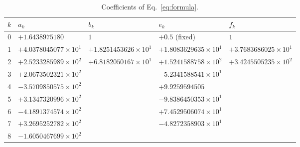 \documentclass[aps,prd,onecolumn,superscriptaddress,nofootinbib,10pt]{revtex4-2}
\begin{document}
\begin{table}[t]
\caption{Coefficients of Eq.~\eqref{eq:formula}.}
\label{tab:coef}
\footnotesize
\begin{ruledtabular}
\begin{tabular}{rllll}
$k$ & $a_k$ & $b_k$ & $e_k$ & $f_k$ \\ \hline
0 & $+1.6438975180$ & $1$ & $+0.5$ (fixed) & $1$ \\
1 & $+4.0378045077\times10^{1}$ & $+1.8251453626\times10^{1}$ & $+1.8083629635\times10^{1}$ & $+3.7683686025\times10^{1}$ \\
2 & $+2.5233285989\times10^{2}$ & $+6.8182050167\times10^{1}$ & $+1.5241588758\times10^{2}$ & $+3.4245505235\times10^{2}$ \\
3 & $+2.0673502321\times10^{2}$ & & $-5.2341588541\times10^{1}$ & \\
4 & $-3.5709850575\times10^{2}$ & & $+9.9259594505$ & \\
5 & $+3.1347320996\times10^{2}$ & & $-9.8386450353\times10^{1}$ & \\
6 & $-4.1891374574\times10^{2}$ & & $+7.4529506074\times10^{1}$ & \\
7 & $+3.2695252782\times10^{2}$ & & $-4.8272358903\times10^{1}$ & \\
8 & $-1.6050467699\times10^{2}$ & & & \\
\end{tabular}
\end{ruledtabular}
\end{table}
\end{document}
